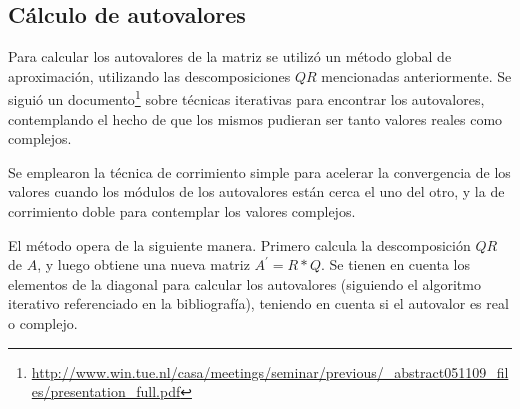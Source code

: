 \documentclass[spanish]{article}
\begin{document}
        \subsection{Cálculo de autovalores}
        
            \par Para calcular los autovalores de la matriz se utilizó un método global de aproximación, utilizando las descomposiciones $QR$ mencionadas anteriormente. Se siguió un documento\footnote{\url{http://www.win.tue.nl/casa/meetings/seminar/previous/_abstract051109_files/presentation_full.pdf}} sobre técnicas iterativas para encontrar los autovalores, contemplando el hecho de que los mismos pudieran ser tanto valores reales como complejos.
            
            \par Se emplearon la técnica de corrimiento simple para acelerar la convergencia de los valores cuando los módulos de los autovalores están cerca el uno del otro, y la de corrimiento doble para contemplar los valores complejos.
            
            \par El método opera de la siguiente manera. Primero calcula la descomposición $QR$ de $A$, y luego obtiene una nueva matriz $A^{\prime} = R * Q$. Se tienen en cuenta los elementos de la diagonal para calcular los autovalores (siguiendo el algoritmo iterativo referenciado en la bibliografía), teniendo en cuenta si el autovalor es real o complejo.
            
            
        
\end{document}
